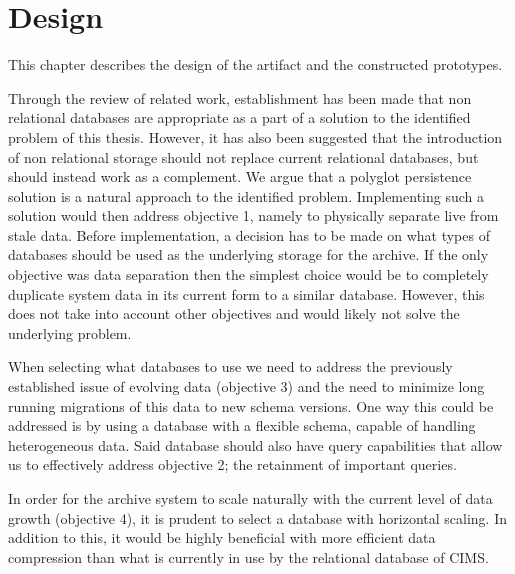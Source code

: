 \chapter{Design}
\label{chap:design}


This chapter describes the design of the artifact and the constructed prototypes.

Through the review of related work, establishment has been made that non relational databases are appropriate as a part of a solution to the identified problem of this thesis. However, it has also been suggested \cite{NoSQLSurvey} that the introduction of non relational storage should not replace current relational databases, but should instead work as a complement. We argue that a polyglot persistence solution is a natural approach to the identified problem. Implementing such a solution would then address objective 1, namely to physically separate live from stale data. Before implementation, a decision has to be made on what types of databases should be used as the underlying storage for the archive. If the only objective was data separation then the simplest choice would be to completely duplicate system data in its current form to a similar database. However, this does not take into account other objectives and would likely not solve the underlying problem. 

When selecting what databases to use we need to address the previously established issue of evolving data (objective 3) and the need to minimize long running migrations of this data to new schema versions. One way this could be addressed is by using a database with a flexible schema, capable of handling heterogeneous data. Said database should also have query capabilities that allow us to effectively address objective 2; the retainment of important queries.

In order for the archive system to scale naturally with the current level of data growth (objective 4), it is prudent to select a database with horizontal scaling. In addition to this, it would be highly beneficial with more efficient data compression than what is currently in use by the relational database of CIMS.

